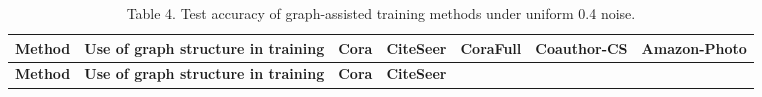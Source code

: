 \begin{longtable}[]{@{}
  >{\raggedright\arraybackslash}p{}
  >{\raggedright\arraybackslash}p{}
  >{\centering\arraybackslash}p{}
  >{\centering\arraybackslash}p{}
  >{\centering\arraybackslash}p{}
  >{\centering\arraybackslash}p{}
  >{\centering\arraybackslash}p{}@{}}
\caption{Table 4. Test accuracy of graph-assisted training methods under uniform 0.4 noise.}\tabularnewline
\toprule\noalign{}
\begin{minipage}[b]{\linewidth}\raggedright
\textbf{Method}
\end{minipage} & \begin{minipage}[b]{\linewidth}\raggedright
\textbf{Use of graph structure in training}
\end{minipage} & \begin{minipage}[b]{\linewidth}\centering
\textbf{Cora}
\end{minipage} & \begin{minipage}[b]{\linewidth}\centering
\textbf{CiteSeer}
\end{minipage} & \begin{minipage}[b]{\linewidth}\centering
\textbf{CoraFull}
\end{minipage} & \begin{minipage}[b]{\linewidth}\centering
\textbf{Coauthor-CS}
\end{minipage} & \begin{minipage}[b]{\linewidth}\centering
\textbf{Amazon-Photo}
\end{minipage} \\
\midrule\noalign{}
\endfirsthead
\toprule\noalign{}
\begin{minipage}[b]{\linewidth}\raggedright
\textbf{Method}
\end{minipage} & \begin{minipage}[b]{\linewidth}\raggedright
\textbf{Use of graph structure in training}
\end{minipage} & \begin{minipage}[b]{\linewidth}\centering
\textbf{Cora}
\end{minipage} & \begin{minipage}[b]{\linewidth}\centering
\textbf{CiteSeer}
\end{minipage} & \begin{minipage}[b]{\linewidth}\centering

\end{minipage}
\end{longtable}

